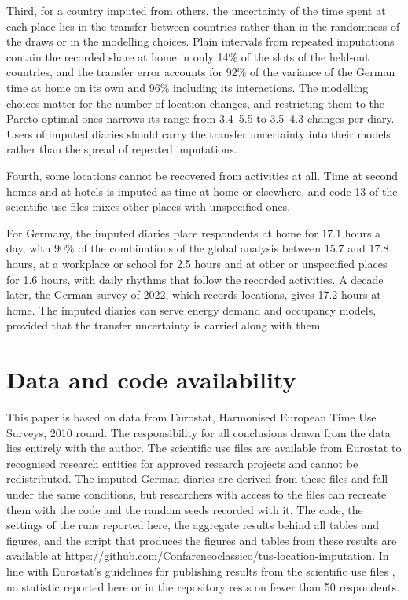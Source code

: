 \documentclass[a4paper]{article}
\begin{document}
Third, for a country imputed from others, the uncertainty of the time spent at each place lies in the transfer between countries rather than in the randomness of the draws or in the modelling choices. Plain intervals from repeated imputations contain the recorded share at home in only 14\% of the slots of the held-out countries, and the transfer error accounts for 92\% of the variance of the German time at home on its own and 96\% including its interactions. The modelling choices matter for the number of location changes, and restricting them to the Pareto-optimal ones narrows its range from 3.4--5.5 to 3.5--4.3 changes per diary. Users of imputed diaries should carry the transfer uncertainty into their models rather than the spread of repeated imputations.

Fourth, some locations cannot be recovered from activities at all. Time at second homes and at hotels is imputed as time at home or elsewhere, and code 13 of the scientific use files mixes other places with unspecified ones.

For Germany, the imputed diaries place respondents at home for 17.1 hours a day, with 90\% of the combinations of the global analysis between 15.7 and 17.8 hours, at a workplace or school for 2.5 hours and at other or unspecified places for 1.6 hours, with daily rhythms that follow the recorded activities. A decade later, the German survey of 2022, which records locations, gives 17.2 hours at home. The imputed diaries can serve energy demand and occupancy models, provided that the transfer uncertainty is carried along with them.

\section*{Data and code availability}

This paper is based on data from Eurostat, Harmonised European Time Use Surveys, 2010 round. The responsibility for all conclusions drawn from the data lies entirely with the author. The scientific use files are available from Eurostat to recognised research entities for approved research projects and cannot be redistributed. The imputed German diaries are derived from these files and fall under the same conditions, but researchers with access to the files can recreate them with the code and the random seeds recorded with it. The code, the settings of the runs reported here, the aggregate results behind all tables and figures, and the script that produces the figures and tables from these results are available
at \url{https://github.com/Confareneoclassico/tus-location-imputation}.
In line with Eurostat's guidelines for publishing results from the scientific use files \parencite{eurostatGuidelinesPublication2026}, no statistic reported here or in the repository rests on fewer than 50 respondents.
\end{document}
